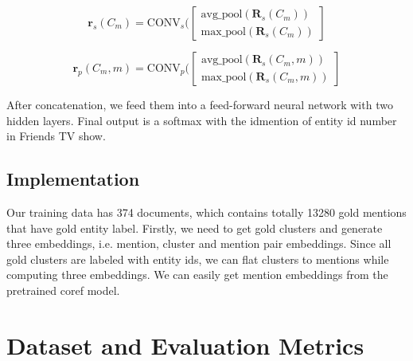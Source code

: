\documentclass[11pt]{article}
\begin{document}
\begin{equation}
\mathbf{r}_s(C_m) = \textrm{CONV}_s(\begin{bmatrix}
\text{avg\_pool}(\mathbf{R}_s(C_m))\\
\text{max\_pool}(\mathbf{R}_s(C_m))
\end{bmatrix}
\end{equation}


\begin{equation}
\mathbf{r}_p(C_m,m) = \textrm{CONV}_p(\begin{bmatrix}
\text{avg\_pool}(\mathbf{R}_s(C_m,m))\\
\text{max\_pool}(\mathbf{R}_s(C_m,m))
\end{bmatrix}
\end{equation}


After concatenation, we feed them into a feed-forward neural network with two hidden layers. Final output is a softmax with the idmention of entity id number in Friends TV show.

\subsection{Implementation}
Our training data has 374 documents, which contains totally 13280 gold mentions that have gold entity label. Firstly, we need to get gold clusters and generate three embeddings, i.e. mention, cluster and mention pair embeddings. Since all gold clusters are labeled with entity ids, we can flat clusters to mentions while computing three embeddings. We can easily get mention embeddings from the pretrained coref model.


\section{Dataset and Evaluation Metrics}
\end{document}
